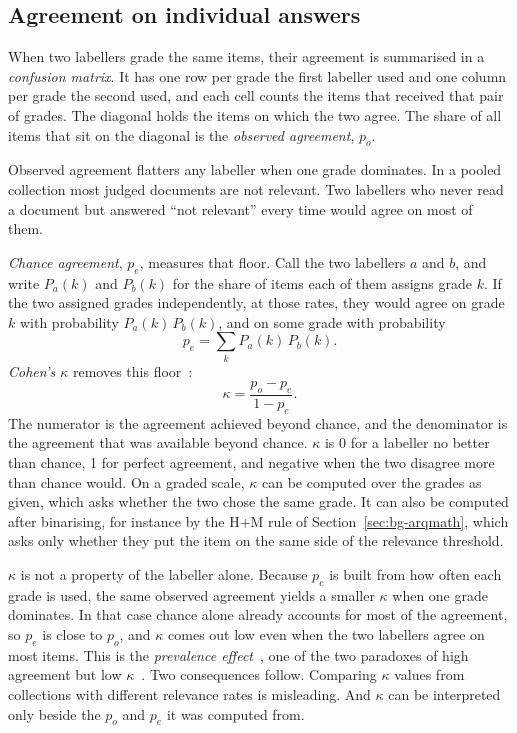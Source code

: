 \subsection*{Agreement on individual answers}

When two labellers grade the same items, their agreement is summarised in a
\emph{confusion matrix}. It has one row per grade the first labeller used and one
column per grade the second used, and each cell counts the items that received that
pair of grades. The diagonal holds the items on which the two agree. The share of all
items that sit on the diagonal is the \emph{observed agreement}, $p_o$.

Observed agreement flatters any labeller when one grade dominates. In a pooled
collection most judged documents are not relevant. Two labellers who never read a
document but answered ``not relevant'' every time would agree on most of them.

\emph{Chance agreement}, $p_e$, measures that floor. Call the two labellers $a$ and $b$, and write $P_a(k)$ and $P_b(k)$ for the share of items each of them assigns grade $k$. If the two assigned grades independently, at those rates, they would agree on grade $k$ with probability $P_a(k)\,P_b(k)$, and on some grade with probability
\begin{equation}
p_e = \sum_k P_a(k)\,P_b(k) .
\end{equation}
\emph{Cohen's $\kappa$} removes this floor~\cite{cohen1960kappa}:
\begin{equation}
\kappa = \frac{p_o - p_e}{1 - p_e} .
\end{equation}
The numerator is the agreement achieved beyond chance, and the denominator is the
agreement that was available beyond chance. $\kappa$ is 0 for a labeller no better
than chance, 1 for perfect agreement, and negative when the two disagree more than
chance would. On a graded scale, $\kappa$ can be computed over the grades as given,
which asks whether the two chose the same grade. It can also be computed after
binarising, for instance by the H+M rule of Section~\ref{sec:bg-arqmath}, which asks
only whether they put the item on the same side of the relevance threshold.

$\kappa$ is not a property of the labeller alone. Because $p_e$ is built from how
often each grade is used, the same observed agreement yields a smaller $\kappa$ when
one grade dominates. In that case chance alone already accounts for most of the agreement, so $p_e$ is close to $p_o$, and $\kappa$ comes out low even when the two labellers agree on most items. This is the
\emph{prevalence effect}~\cite{simwright2005kappa}, one of the two paradoxes of high
agreement but low $\kappa$~\cite{feinstein1990kappa}. Two consequences follow.
Comparing $\kappa$ values from collections with different relevance rates is
misleading. And $\kappa$ can be interpreted only beside the $p_o$ and $p_e$ it was
computed from.

